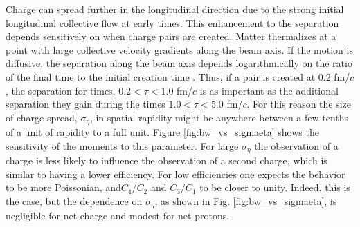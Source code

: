Charge can spread further in the longitudinal direction due to the strong initial longitudinal collective flow at early times. This enhancement to the separation depends sensitively on when charge pairs are created. Matter thermalizes at a point with large collective velocity gradients along the beam axis. If the motion is diffusive, the separation along the beam axis depends logarithmically on the ratio of the final time to the initial creation time \cite{Bass:2000az}.  Thus, if a pair is created at 0.2 fm/$c$, the separation for times, $0.2<\tau<1.0$ fm/$c$ is as important as the additional separation they gain during the times $1.0<\tau<5.0$ fm/$c$. For this reason the size of charge spread, $\sigma_\eta$, in spatial rapidity might be anywhere between a few tenths of a unit of rapidity to a full unit. Figure \ref{fig:bw_vs_sigmaeta} shows the sensitivity of the moments to this parameter. For large $\sigma_\eta$ the observation of a charge is less likely to influence the observation of a second charge, which is similar to having a lower efficiency. For low efficiencies one expects the behavior to be more Poissonian, and$C_4/C_2$ and $C_3/C_1$ to be closer to unity. Indeed, this is the case, but the dependence on $\sigma_\eta$, as shown in Fig. \ref{fig:bw_vs_sigmaeta}, is negligible for net charge and modest for net protons.
